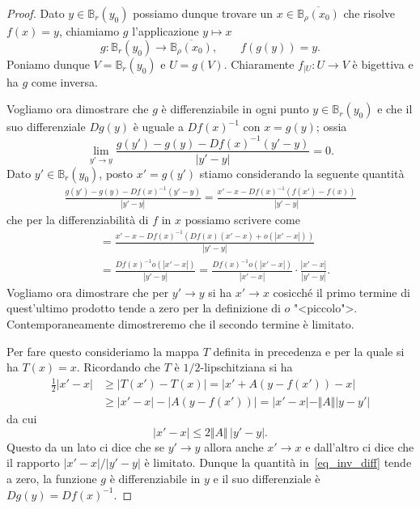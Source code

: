 \documentclass[italian]{article}
\theoremstyle{remark}
\newcommand{\B}{{\mathbb B}}  %
\begin{document}
\begin{proof}
Dato $y\in \B_r(y_0)$ possiamo dunque trovare un
$x\in \overline{\B_\rho(x_0)}$ che risolve $f(x)=y$, chiamiamo
$g$ l'applicazione $y\mapsto x$
        \[
        g\colon \B_r(y_0) \to \overline{\B_\rho(x_0)}, \qquad f(g(y))=y.
        \]
Poniamo dunque $V=\B_r(y_0)$ e $U=g(V)$. Chiaramente $f_{|U}\colon U\to V$ \`e
bigettiva e ha $g$ come inversa. 

Vogliamo ora dimostrare che $g$ \`e differenziabile in ogni punto
$y\in \B_r(y_0)$ e che il suo differenziale $Dg(y)$ \`e uguale a
$Df(x)^{-1}$ con $x=g(y)$; ossia
\[
\lim_{y'\to y} \frac{g(y')-g(y) - Df(x)^{-1}(y'-y)}{|y'-y|}=0.
\]
Dato $y'\in \B_r(y_0)$, posto $x'=g(y')$ stiamo considerando la
seguente quantit\`a
\begin{align*}
\frac{g(y')-g(y) - Df(x)^{-1}(y'-y)}{|y'-y|} 
=
\frac{x'-x - Df(x)^{-1}(f(x')-f(x))}{|y'-y|}
\end{align*}
che per la differenziabilit\`a di $f$ in $x$ possiamo scrivere come
\begin{equation}
\label{eq_inv_diff}
\begin{aligned}
&=
\frac{x'-x - Df(x)^{-1}(Df(x)(x'-x)+o(|x'-x|))}{|y'-y|}\\
&=
\frac{Df(x)^{-1} o(|x'-x|)}{|y'-y|}
=
\frac{Df(x)^{-1} o(|x'-x|)}{|x'-x|}\cdot \frac{|x'-x|}{|y'-y|}.
\end{aligned}
\end{equation}
Vogliamo ora dimostrare che per $y'\to y$ si ha $x'\to x$ cosicch\'e 
il primo termine di quest'ultimo prodotto tende
a zero per la definizione di $o$ "<piccolo">. Contemporaneamente 
dimostreremo che il secondo termine \`e limitato.

Per fare questo consideriamo la mappa $T$ definita in
precedenza e per la quale si ha $T(x)=x$. 
Ricordando che $T$ \`e $1/2$-lipschitziana si ha
\begin{equation}\label{erro}
\begin{aligned}
\frac 1 2 |x'-x| &\ge |T(x')-T(x)| = |x'+A(y-f(x'))-x|\\
&\ge |x'-x| - |A(y-f(x'))|
= |x'-x| - \Vert A \Vert |y-y'|
\end{aligned}
\end{equation}
da cui
\[
|x'-x| \le 2\Vert A\Vert \,|y'-y|.
\]
Questo da un lato ci dice che se $y'\to y$ allora anche $x'\to x$ e
dall'altro ci dice che il rapporto $|x'-x|/|y'-y|$ \`e limitato.
Dunque la quantit\`a in~\eqref{eq_inv_diff} tende a zero, 
la funzione $g$ \`e differenziabile in $y$ e il suo
differenziale \`e $Dg(y)=Df(x)^{-1}$.



\end{proof}
\end{document}
